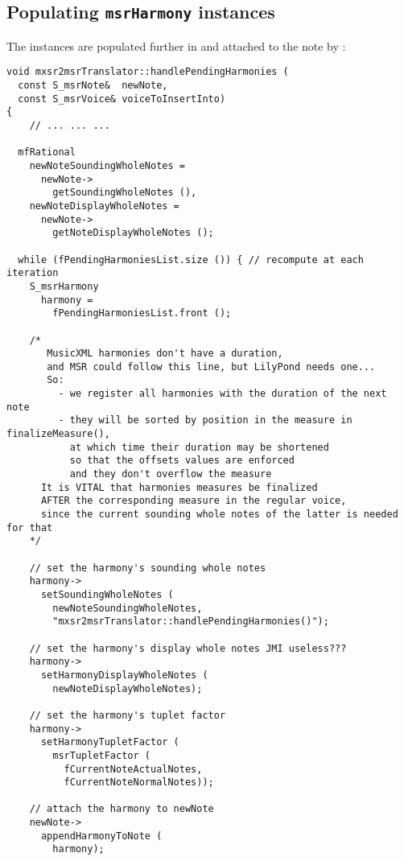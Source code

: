 \subsection{Populating {\tt msrHarmony} instances}

The  instances are populated further in  and attached to the note by : %
\begin{lstlisting}[language=CPlusPlus]
void mxsr2msrTranslator::handlePendingHarmonies (
  const S_msrNote&  newNote,
  const S_msrVoice& voiceToInsertInto)
{
	// ... ... ...

  mfRational
    newNoteSoundingWholeNotes =
      newNote->
        getSoundingWholeNotes (),
    newNoteDisplayWholeNotes =
      newNote->
        getNoteDisplayWholeNotes ();

  while (fPendingHarmoniesList.size ()) { // recompute at each iteration
    S_msrHarmony
      harmony =
        fPendingHarmoniesList.front ();

    /*
       MusicXML harmonies don't have a duration,
       and MSR could follow this line, but LilyPond needs one...
       So:
         - we register all harmonies with the duration of the next note
         - they will be sorted by position in the measure in finalizeMeasure(),
           at which time their duration may be shortened
           so that the offsets values are enforced
           and they don't overflow the measure
      It is VITAL that harmonies measures be finalized
      AFTER the corresponding measure in the regular voice,
      since the current sounding whole notes of the latter is needed for that
    */

    // set the harmony's sounding whole notes
    harmony->
      setSoundingWholeNotes (
        newNoteSoundingWholeNotes,
        "mxsr2msrTranslator::handlePendingHarmonies()");

    // set the harmony's display whole notes JMI useless???
    harmony->
      setHarmonyDisplayWholeNotes (
        newNoteDisplayWholeNotes);

    // set the harmony's tuplet factor
    harmony->
      setHarmonyTupletFactor (
        msrTupletFactor (
          fCurrentNoteActualNotes,
          fCurrentNoteNormalNotes));

    // attach the harmony to newNote
    newNote->
      appendHarmonyToNote (
        harmony);


\end{lstlisting}
